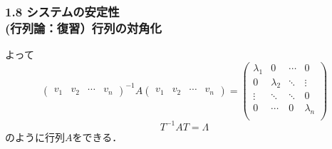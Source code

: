 \begin{frame}[t]
\frametitle{1.8 システムの安定性 \\
 (行列論：復習）行列の対角化}
よって
\begin{equation}
 \left(
 \begin{array}{cccc}
  v_1 & v_2 & \cdots & v_n
 \end{array}
 \right)^{-1} A
 \left(
 \begin{array}{cccc}
  v_1 & v_2 & \cdots & v_n
 \end{array}
 \right) =
 \left(
 \begin{array}{cccc}
  \lambda_1 & 0         & \cdots & 0 \\
   0        & \lambda_2 & \ddots & \vdots \\
   \vdots   & \ddots    & \ddots & 0\\
   0        & \cdots    &   0    & \lambda_n \\
 \end{array}
 \right)
\end{equation}
\begin{equation}
  T^{-1}AT =  \Lambda
\end{equation}
のように行列$A$をできる．

\end{frame}


